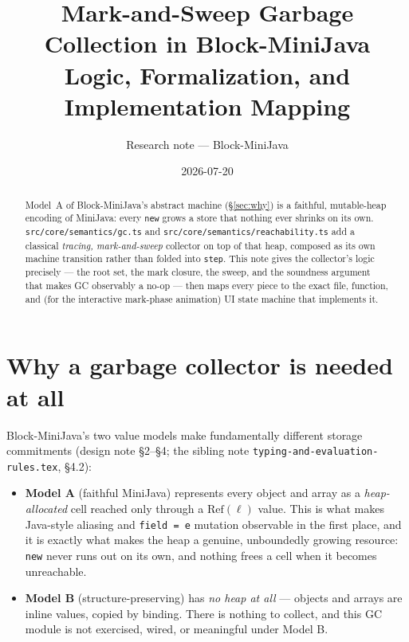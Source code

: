 \documentclass[11pt]{article}
\title{Mark-and-Sweep Garbage Collection in Block-MiniJava\\
\large Logic, Formalization, and Implementation Mapping}
\author{Research note --- Block-MiniJava}
\date{2026-07-20}
\begin{document}
\maketitle

\begin{abstract}
Model~A of Block-MiniJava's abstract machine (\S\ref{sec:why}) is a
faithful, mutable-heap encoding of MiniJava: every \texttt{new} grows a
store that nothing ever shrinks on its own. \texttt{src/core/semantics/gc.ts}
and \texttt{src/core/semantics/reachability.ts} add a classical
\emph{tracing, mark-and-sweep} collector on top of that heap, composed as
its own machine transition rather than folded into \texttt{step}. This note
gives the collector's logic precisely --- the root set, the mark closure,
the sweep, and the soundness argument that makes GC observably a no-op ---
then maps every piece to the exact file, function, and (for the interactive
mark-phase animation) UI state machine that implements it.
\end{abstract}

\tableofcontents

\section{Why a garbage collector is needed at all}
\label{sec:why}

Block-MiniJava's two value models make fundamentally different storage
commitments (design note \S2--\S4; the sibling note
\texttt{typing-and-evaluation-rules.tex}, \S4.2):

\begin{itemize}
  \item \textbf{Model A} (faithful MiniJava) represents every object and
        array as a \emph{heap-allocated} cell reached only through a
        $\mathrm{Ref}(\ell)$ value. This is what makes Java-style aliasing
        and \texttt{field = e} mutation observable in the first place, and
        it is exactly what makes the heap a genuine, unboundedly growing
        resource: \texttt{new} never runs out on its own, and nothing frees
        a cell when it becomes unreachable.
  \item \textbf{Model B} (structure-preserving) has \emph{no heap at all}
        --- objects and arrays are inline values, copied by binding. There
        is nothing to collect, and this GC module is not exercised, wired,
        or meaningful under Model B.
\end{itemize}
\end{document}
